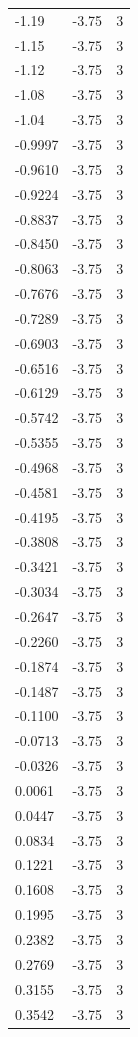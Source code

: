 \begin{longtable}{lrr}
  -1.19 & -3.75 & 3 \\
  -1.15 & -3.75 & 3 \\
  -1.12 & -3.75 & 3 \\
  -1.08 & -3.75 & 3 \\
  -1.04 & -3.75 & 3 \\
  -0.9997 & -3.75 & 3 \\
  -0.9610 & -3.75 & 3 \\
  -0.9224 & -3.75 & 3 \\
  -0.8837 & -3.75 & 3 \\
  -0.8450 & -3.75 & 3 \\
  -0.8063 & -3.75 & 3 \\
  -0.7676 & -3.75 & 3 \\
  -0.7289 & -3.75 & 3 \\
  -0.6903 & -3.75 & 3 \\
  -0.6516 & -3.75 & 3 \\
  -0.6129 & -3.75 & 3 \\
  -0.5742 & -3.75 & 3 \\
  -0.5355 & -3.75 & 3 \\
  -0.4968 & -3.75 & 3 \\
  -0.4581 & -3.75 & 3 \\
  -0.4195 & -3.75 & 3 \\
  -0.3808 & -3.75 & 3 \\
  -0.3421 & -3.75 & 3 \\
  -0.3034 & -3.75 & 3 \\
  -0.2647 & -3.75 & 3 \\
  -0.2260 & -3.75 & 3 \\
  -0.1874 & -3.75 & 3 \\
  -0.1487 & -3.75 & 3 \\
  -0.1100 & -3.75 & 3 \\
  -0.0713 & -3.75 & 3 \\
  -0.0326 & -3.75 & 3 \\
  0.0061 & -3.75 & 3 \\
  0.0447 & -3.75 & 3 \\
  0.0834 & -3.75 & 3 \\
  0.1221 & -3.75 & 3 \\
  0.1608 & -3.75 & 3 \\
  0.1995 & -3.75 & 3 \\
  0.2382 & -3.75 & 3 \\
  0.2769 & -3.75 & 3 \\
  0.3155 & -3.75 & 3 \\
  0.3542 & -3.75 & 3 \\

\end{longtable}

